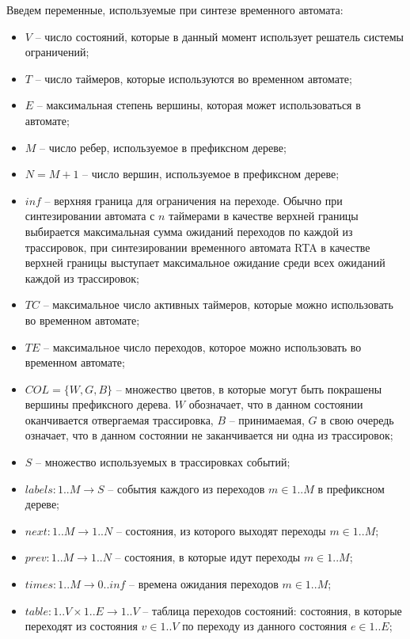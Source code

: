 \documentclass[times,specification,annotation]{itmo-student-thesis}
\begin{document}
Введем переменные, используемые при синтезе временного автомата:

\begin{itemize}
  \item $V$ -- число состояний, которые в данный момент использует решатель системы ограничений;
  \item $T$ -- число таймеров, которые используются во временном автомате;
  \item $E$ -- максимальная степень вершины, которая может использоваться в автомате;
  \item $M$ -- число ребер, используемое в префиксном дереве;
  \item $N = M + 1$ -- число вершин, используемое в префиксном дереве;
  \item $inf$ -- верхняя граница для ограничения на переходе. Обычно при синтезировании автомата с $n$ таймерами в качестве верхней границы выбирается максимальная сумма
    ожиданий переходов по каждой из трассировок, при синтезировании временного автомата RTA в качестве верхней границы выступает максимальное ожидание среди всех ожиданий
    каждой из трассировок;
  \item $TC$ -- максимальное число активных таймеров, которые можно использовать во временном автомате;
  \item $TE$ -- максимальное число переходов, которое можно использовать во временном автомате;
  \item $COL = \{ W, G, B \}$ -- множество цветов, в которые могут быть покрашены вершины префиксного дерева. $W$ обозначает, что в данном состоянии оканчивается отвергаемая
    трассировка, $B$ -- принимаемая, $G$ в свою очередь означает, что в данном состоянии не заканчивается ни одна из трассировок;
  \item $S$ -- множество используемых в трассировках событий;
  \item $labels: 1..M \rightarrow S$ -- события каждого из переходов $m \in 1..M$ в префиксном дереве;
  \item $next: 1..M \rightarrow 1..N$ -- состояния, из которого выходят переходы $m \in 1..M$;
  \item $prev: 1..M \rightarrow 1..N$ -- состояния, в которые идут переходы $m \in 1..M$;
  \item $times: 1..M \rightarrow 0..inf$ -- времена ожидания переходов $m \in 1..M$;
  \item $table: 1..V \times 1..E \rightarrow 1..V$ -- таблица переходов состояний: состояния, в которые переходят из состояния $v \in 1..V$ по переходу из данного состояния $e \in 1..E$;

\end{itemize}
\end{document}
